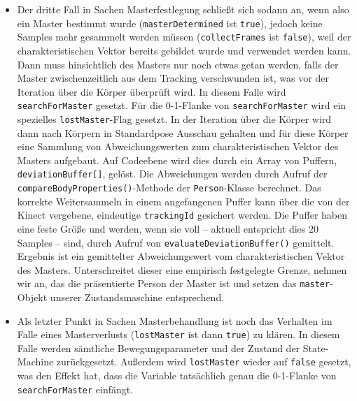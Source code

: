 \begin{itemize}
\item Der dritte Fall in Sachen Masterfestlegung schließt sich sodann an, wenn also ein Master bestimmt wurde (\texttt{masterDetermined} ist \texttt{true}), jedoch keine Samples mehr gesammelt werden müssen (\texttt{collectFrames} ist \texttt{false}), weil der charakteristischen Vektor bereits gebildet wurde und verwendet werden kann. Dann muss hinsichtlich des Masters nur noch etwas getan werden, falls der Master zwischenzeitlich aus dem Tracking verschwunden ist, was vor der Iteration über die Körper überprüft wird. In diesem Falle wird \texttt{searchForMaster} gesetzt. Für die 0-1-Flanke von \texttt{searchForMaster} wird ein spezielles \texttt{lostMaster}-Flag gesetzt. In der Iteration über die Körper wird dann nach Körpern in Standardpose Ausschau gehalten und für diese Körper eine Sammlung von Abweichungswerten zum charakteristischen Vektor des Masters aufgebaut. Auf Codeebene wird dies durch ein Array von Puffern, \texttt{deviationBuffer[]}, gelöst. Die Abweichungen werden durch Aufruf der \texttt{compareBodyProperties()}-Methode der \texttt{Person}-Klasse berechnet. Das korrekte Weitersammeln in einem angefangenen Puffer kann über die von der Kinect vergebene, eindeutige \texttt{trackingId} gesichert werden. Die Puffer haben eine feste Größe und werden, wenn sie voll -- aktuell entspricht dies 20 Samples -- sind, durch Aufruf von \texttt{evaluateDeviationBuffer()} gemittelt. Ergebnis ist ein gemittelter Abweichungswert vom charakteristischen Vektor des Masters. Unterschreitet dieser eine empirisch festgelegte Grenze, nehmen wir an, das die präsentierte Person der Master ist und setzen das \texttt{master}-Objekt unserer Zustandsmaschine entsprechend.\par 
\item Als letzter Punkt in Sachen Masterbehandlung ist noch das Verhalten im Falle eines Masterverlusts (\texttt{lostMaster} ist dann \texttt{true}) zu klären. In diesem Falle werden sämtliche Bewegungsparameter und der Zustand der State-Machine zurückgesetzt. Außerdem wird \texttt{lostMaster} wieder auf \texttt{false} gesetzt, was den Effekt hat, dass die Variable tatsächlich genau die 0-1-Flanke von \texttt{searchForMaster} einfängt.\par
\end{itemize}
